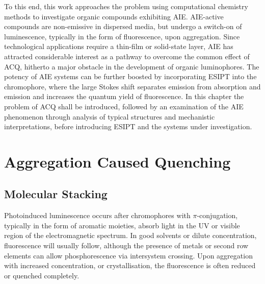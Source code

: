 To this end, this work approaches the problem using computational chemistry methods to investigate organic compounds exhibiting \ac{AIE}. AIE-active compounds are non-emissive in dispersed media, but undergo a switch-on of luminescence, typically in the form of fluorescence, upon aggregation. Since technological applications require a thin-film or solid-state layer, AIE has attracted considerable interest as a pathway to overcome the common effect of \ac{ACQ}, hitherto a major obstacle in the development of organic luminophores. The potency of \ac{AIE} systems can be further boosted by incorporating \acf{ESIPT} into the chromophore, where the large Stokes shift separates emission from absorption and emission and increases the quantum yield of fluorescence. In this chapter the problem of \ac{ACQ} shall be introduced, followed by an examination of the AIE phenomenon through analysis of typical structures and mechanistic interpretations, before introducing \ac{ESIPT} and the systems under investigation.
\section{Aggregation Caused Quenching}\label{section: lom ACQ}
\subsection{Molecular Stacking}
Photoinduced luminescence occurs after chromophores with $\pi$-conjugation, typically in the form of aromatic moieties, absorb light in the \ac{UV} or visible region of the electromagnetic spectrum. In good solvents or dilute concentration, fluorescence will usually follow, although the presence of metals or second row elements can allow phosphorescence via intersystem crossing. Upon aggregation with increased concentration, or crystallisation, the fluorescence is often reduced or quenched completely. 

